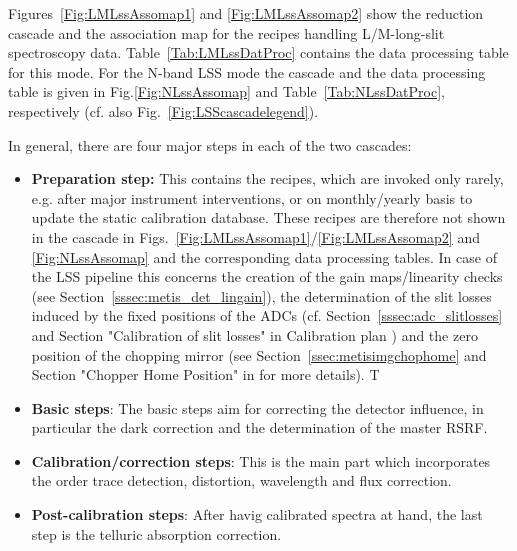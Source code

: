 
Figures~\ref{Fig:LMLssAssomap1} and \ref{Fig:LMLssAssomap2} show the reduction cascade and the association map for the recipes handling L/M-long-slit
spectroscopy data.  Table~\ref{Tab:LMLssDatProc} contains the data processing table for this mode. For the N-band \ac{LSS} mode the cascade and the data processing table is given in Fig.\ref{Fig:NLssAssomap} and Table~\ref{Tab:NLssDatProc}, respectively (cf. also Fig.~\ref{Fig:LSScascadelegend}).

In general, there are four major steps in each of the two cascades:
\begin{itemize}
    \item \textbf{Preparation step:} This contains the recipes, which are invoked only rarely, e.g. after major instrument interventions, or on monthly/yearly basis to update the static calibration database. These recipes are therefore not shown in the cascade in Figs.~\ref{Fig:LMLssAssomap1}/\ref{Fig:LMLssAssomap2} and \ref{Fig:NLssAssomap} and the corresponding data processing tables. In case of the \ac{LSS} pipeline this concerns the creation of the gain maps/linearity checks (see Section~\ref{sssec:metis_det_lingain}), the determination of the slit losses induced by the fixed positions of the ADCs (cf. Section~\ref{sssec:adc_slitlosses} and Section "Calibration of slit losses" in Calibration plan \cite{METIS-calibration_plan}) and the zero position of the chopping mirror (see Section~\ref{ssec:metisimgchophome} and Section "Chopper Home Position" in \cite{METIS-calibration_plan} for more details). T
    \item \textbf{Basic steps}: The basic steps aim for correcting the detector influence, in particular the dark correction and the determination of the master \ac{RSRF}.
    \item \textbf{Calibration/correction steps}: This is the main part which incorporates the order trace detection, distortion, wavelength and flux correction.
    \item \textbf{Post-calibration steps}: After havig calibrated spectra at hand, the last step is the telluric absorption correction.
\end{itemize}

